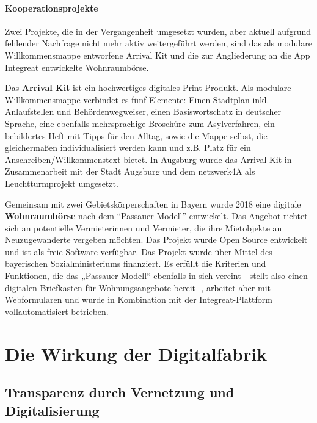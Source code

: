 \documentclass[12pt, a4paper]{article} %
\begin{document}
\hypertarget{kooperationsprojekte}{%
\paragraph{Kooperationsprojekte}\label{kooperationsprojekte}}

Zwei Projekte, die in der Vergangenheit umgesetzt wurden, aber aktuell
aufgrund fehlender Nachfrage nicht mehr aktiv weitergeführt werden, sind
das als modulare Willkommensmappe entworfene Arrival Kit und die zur
Angliederung an die App Integreat entwickelte Wohnraumbörse.

Das \textbf{Arrival Kit} ist ein hochwertiges digitales Print-Produkt.
Als modulare Willkommensmappe verbindet es fünf Elemente: Einen
Stadtplan inkl. Anlaufstellen und Behördenwegweiser, einen
Basiswortschatz in deutscher Sprache, eine ebenfalls mehrsprachige
Broschüre zum Asylverfahren, ein bebildertes Heft mit Tipps für den
Alltag, sowie die Mappe selbst, die gleichermaßen individualisiert
werden kann und z.B. Platz für ein Anschreiben/Willkommenstext bietet.
In Augsburg wurde das Arrival Kit in Zusammenarbeit mit der Stadt
Augsburg und dem netzwerk4A als Leuchtturmprojekt umgesetzt.

Gemeinsam mit zwei Gebietskörperschaften in Bayern wurde 2018 eine
digitale \textbf{Wohnraumbörse} nach dem “Passauer Modell” entwickelt.
Das Angebot richtet sich an potentielle Vermieterinnen und Vermieter,
die ihre Mietobjekte an Neuzugewanderte vergeben möchten. Das Projekt
wurde Open Source entwickelt und ist als freie Software verfügbar. Das
Projekt wurde über Mittel des bayerischen Sozialministeriums finanziert.
Es erfüllt die Kriterien und Funktionen, die das „Passauer Modell“
ebenfalls in sich vereint - stellt also einen digitalen Briefkasten für
Wohnungsangebote bereit -, arbeitet aber mit Webformularen und wurde in
Kombination mit der Integreat-Plattform vollautomatisiert betrieben.

\hypertarget{die-wirkung-der-digitalfabrik}{%
\section{Die Wirkung der
Digitalfabrik}\label{die-wirkung-der-digitalfabrik}}

\hypertarget{transparenz-durch-vernetzung-und-digitalisierung}{%
\subsection{Transparenz durch Vernetzung und
Digitalisierung}\label{transparenz-durch-vernetzung-und-digitalisierung}}
\end{document}
